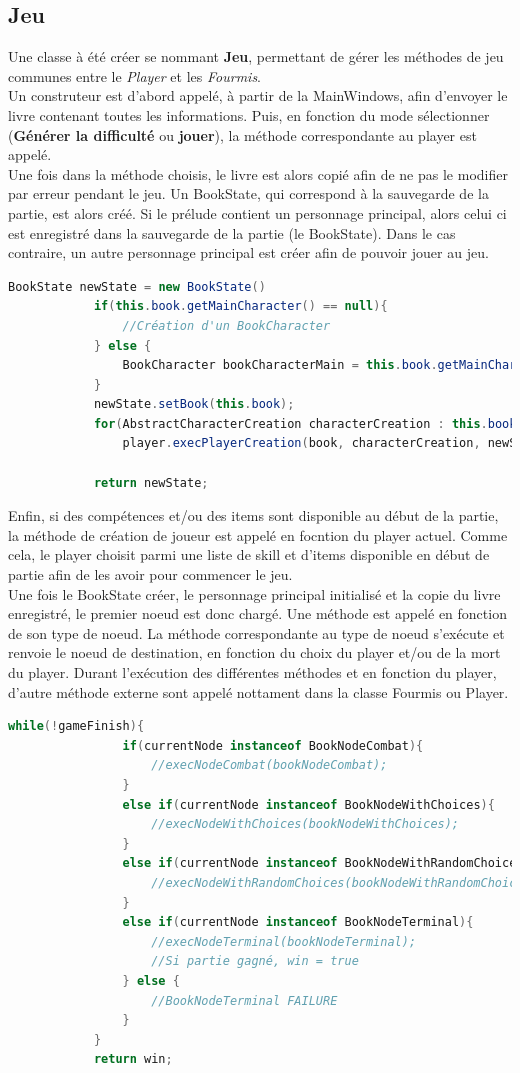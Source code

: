 		\subsection{Jeu}
		Une classe à été créer se nommant \textbf{Jeu}, permettant de gérer les méthodes de jeu communes entre le \textit{Player} et les \textit{Fourmis}.\\
		Un construteur est d'abord appelé, à partir de la MainWindows, afin d'envoyer le livre contenant toutes les informations. Puis, en fonction du mode sélectionner (\textbf{Générer la difficulté} ou \textbf{jouer}), la méthode correspondante au player est appelé.\\
		Une fois dans la méthode choisis, le livre est alors copié afin de ne pas le modifier par erreur pendant le jeu. Un BookState, qui correspond à la sauvegarde de la partie, est alors créé. Si le prélude contient un personnage principal, alors celui ci est enregistré dans la sauvegarde de la partie (le BookState). Dans le cas contraire, un autre personnage principal est créer afin de pouvoir jouer au jeu.\\
		\begin{lstlisting}[language=java]
			BookState newState = new BookState()
			if(this.book.getMainCharacter() == null){
				//Création d'un BookCharacter
			} else {
				BookCharacter bookCharacterMain = this.book.getMainCharacter();
			}
			newState.setBook(this.book);
			for(AbstractCharacterCreation characterCreation : this.book.getCharacterCreations())
				player.execPlayerCreation(book, characterCreation, newState);

			return newState;
		\end{lstlisting}
		Enfin, si des compétences et/ou des items sont disponible au début de la partie, la méthode de création de joueur est appelé en focntion du player actuel. Comme cela, le player choisit parmi une liste de skill et d'items disponible en début de partie afin de les avoir pour commencer le jeu.\\
		Une fois le BookState créer, le personnage principal initialisé et la copie du livre enregistré, le premier noeud est donc chargé. Une méthode est appelé en fonction de son type de noeud. La méthode correspondante au type de noeud s'exécute et renvoie le noeud de destination, en fonction du choix du player et/ou de la mort du player. Durant l'exécution des différentes méthodes et en fonction du player, d'autre méthode externe sont appelé nottament dans la classe Fourmis ou Player.\\
		\begin{lstlisting}[language=java]
			while(!gameFinish){
				if(currentNode instanceof BookNodeCombat){
					//execNodeCombat(bookNodeCombat);
				}
				else if(currentNode instanceof BookNodeWithChoices){
					//execNodeWithChoices(bookNodeWithChoices);
				}
				else if(currentNode instanceof BookNodeWithRandomChoices){
					//execNodeWithRandomChoices(bookNodeWithRandomChoices);
				}
				else if(currentNode instanceof BookNodeTerminal){
					//execNodeTerminal(bookNodeTerminal);
					//Si partie gagné, win = true
				} else {
					//BookNodeTerminal FAILURE
				}
			}
			return win;
		\end{lstlisting}

